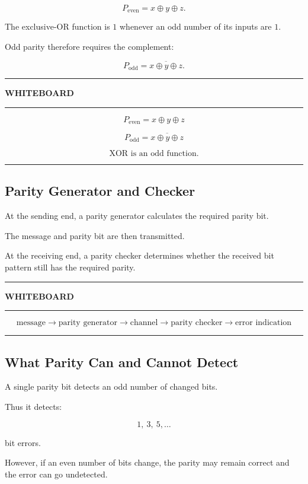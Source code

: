 \documentclass[11pt]{article}
\newenvironment{whiteboard}
{
    \par\medskip
    \begin{center}
    \begin{minipage}{0.94\textwidth}
    \hrule
    \vspace{0.4em}
    \textbf{\large WHITEBOARD}
    \vspace{0.3em}
    \hrule
    \vspace{0.7em}
}
{
    \vspace{0.5em}
    \hrule
    \end{minipage}
    \end{center}
    \medskip
}
\begin{document}
\[
P_{\text{even}}
=
x\oplus y\oplus z.
\]

The exclusive-OR function is \(1\) whenever an odd number of its inputs are
\(1\).

Odd parity therefore requires the complement:

\[
P_{\text{odd}}
=
\overline{x\oplus y\oplus z}.
\]

\begin{whiteboard}
\[
\boxed{P_{\text{even}}=x\oplus y\oplus z}
\]

\[
\boxed{
P_{\text{odd}}
=
\overline{x\oplus y\oplus z}}
\]

\[
\text{XOR is an odd function.}
\]
\end{whiteboard}

\subsection{Parity Generator and Checker}

At the sending end, a parity generator calculates the required parity bit.

The message and parity bit are then transmitted.

At the receiving end, a parity checker determines whether the received bit
pattern still has the required parity.

\begin{whiteboard}
\[
\text{message}
\rightarrow
\boxed{\text{parity generator}}
\rightarrow
\text{channel}
\rightarrow
\boxed{\text{parity checker}}
\rightarrow
\text{error indication}
\]
\end{whiteboard}

\subsection{What Parity Can and Cannot Detect}

A single parity bit detects an odd number of changed bits.

Thus it detects:

\[
1,\ 3,\ 5,\ldots
\]

bit errors.

However, if an even number of bits change, the parity may remain correct and
the error can go undetected.
\end{document}
